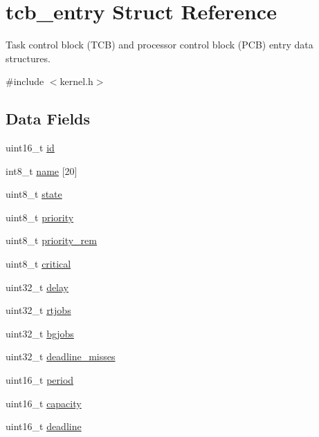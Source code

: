 \hypertarget{structtcb__entry}{\section{tcb\-\_\-entry Struct Reference}
\label{structtcb__entry}
}


Task control block (T\-C\-B) and processor control block (P\-C\-B) entry data structures.  




{\ttfamily \#include $<$kernel.\-h$>$}

\subsection*{Data Fields}
\begin{DoxyCompactItemize}
\item 
uint16\-\_\-t \hyperlink{structtcb__entry_ac06c8d6513b9d3031956b0efc2ab4871}{id}
\item 
int8\-\_\-t \hyperlink{structtcb__entry_ad7bfcb0f4b58b797af44f3a078abebff}{name} \mbox{[}20\mbox{]}
\item 
uint8\-\_\-t \hyperlink{structtcb__entry_a67f430ab50cb8ff9133e133fc240f3d7}{state}
\item 
uint8\-\_\-t \hyperlink{structtcb__entry_a5a925d67b6f5391815abcbd2c251c77d}{priority}
\item 
uint8\-\_\-t \hyperlink{structtcb__entry_a63888ca7a7a923f912bf3a404d1261ca}{priority\-\_\-rem}
\item 
uint8\-\_\-t \hyperlink{structtcb__entry_ab76fc52c033f2b9cd0adc9474fcde5ef}{critical}
\item 
uint32\-\_\-t \hyperlink{structtcb__entry_ab29fad6168f140493ddc8f860fadc3bc}{delay}
\item 
uint32\-\_\-t \hyperlink{structtcb__entry_a51802bc7ba3ee4cfcbcbfb404e606643}{rtjobs}
\item 
uint32\-\_\-t \hyperlink{structtcb__entry_a27631962295edabd283477b471f2d7ae}{bgjobs}
\item 
uint32\-\_\-t \hyperlink{structtcb__entry_a4594d17577feba0bd0825c8ef5e693db}{deadline\-\_\-misses}
\item 
uint16\-\_\-t \hyperlink{structtcb__entry_a85e14b4c040e0535b45b52a7ee7c9a94}{period}
\item 
uint16\-\_\-t \hyperlink{structtcb__entry_a2a3c8e5e81c910ccd845a8d1f58d550a}{capacity}
\item 
uint16\-\_\-t \hyperlink{structtcb__entry_a14ef4f38d7589e42ac7847b2bcc3443f}{deadline}

\end{DoxyCompactItemize}

